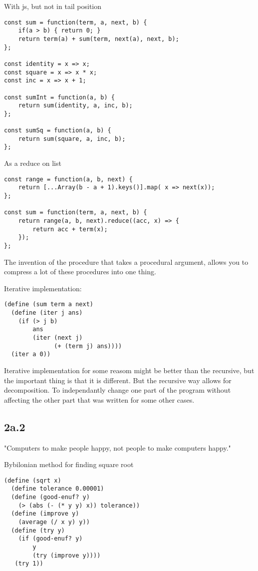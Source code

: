 \documentclass[11pt]{article}
\begin{document}
With js, but not in tail position
\begin{verbatim}
const sum = function(term, a, next, b) {
    if(a > b) { return 0; }
    return term(a) + sum(term, next(a), next, b);
};

const identity = x => x;
const square = x => x * x;
const inc = x => x + 1;

const sumInt = function(a, b) {
    return sum(identity, a, inc, b);
};

const sumSq = function(a, b) {
    return sum(square, a, inc, b);
};
\end{verbatim}

As a reduce on list
\begin{verbatim}
const range = function(a, b, next) {
    return [...Array(b - a + 1).keys()].map( x => next(x));
};

const sum = function(term, a, next, b) {
    return range(a, b, next).reduce((acc, x) => {
        return acc + term(x);
    });
};
\end{verbatim}

The invention of the procedure that takes a procedural argument, allows you
to compress a lot of these procedures into one thing.

Iterative implementation:
\begin{verbatim}
(define (sum term a next)
  (define (iter j ans)
    (if (> j b)
        ans
        (iter (next j)
              (+ (term j) ans))))
  (iter a 0))
\end{verbatim}

Iterative implementation for some reasom might be better than the recursive,
but the important thing is that it is different. But the recursive way
allows for decomposition. To independantly change one part of the program
without affecting the other part that was written for some other cases.

\subsection{2a.2}
\label{sec:org4f3d4f4}
"Computers to make people happy, not people to make computers happy."

Bybilonian method for finding square root
\begin{verbatim}
(define (sqrt x)
  (define tolerance 0.00001)
  (define (good-enuf? y)
    (> (abs (- (* y y) x)) tolerance))
  (define (improve y)
    (average (/ x y) y))
  (define (try y)
    (if (good-enuf? y)
        y
        (try (improve y))))
   (try 1))
\end{verbatim}
\end{document}
